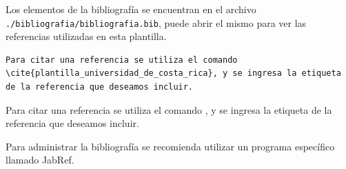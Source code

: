 Los elementos de la bibliografía se encuentran en el archivo \texttt{./bibliografia/bibliografia.bib}, puede abrir el mismo para ver las referencias utilizadas en esta plantilla.


\footnotesize
\begin{lstlisting}
Para citar una referencia se utiliza el comando \cite{plantilla_universidad_de_costa_rica}, y se ingresa la etiqueta de la referencia que deseamos incluir.
\end{lstlisting}
\normalsize

Para citar una referencia se utiliza el comando \cite{plantilla_universidad_de_costa_rica}, y se ingresa la etiqueta de la referencia que deseamos incluir.

Para administrar la bibliografía se recomienda utilizar un programa específico llamado JabRef\cite{jabref}.

